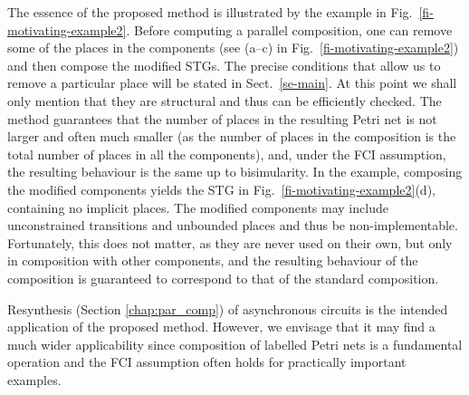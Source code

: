 The essence of the proposed method is illustrated by the example in Fig.~\ref{fi-motivating-example2}. Before computing a parallel composition, one can remove some of the places in the components (see (a--c) in Fig.~\ref{fi-motivating-example2}) and then compose the modified STGs. The precise conditions that allow us to remove a particular place will be stated in Sect.~\ref{se-main}. At this point we shall only mention that they are structural and thus can be efficiently checked. The method  guarantees that the number of places in the resulting Petri net is not larger and often much smaller (as the number of places in the composition is the total number of places in all the components), and, under the FCI assumption, the resulting behaviour is the same up to bisimularity. In the example, composing the modified components yields the STG in Fig.~\ref{fi-motivating-example2}(d), containing no implicit places. The modified components  may include unconstrained transitions and unbounded places and thus be non-implementable. Fortunately, this does not matter, as they are never used on their own, but only in composition with other components, and the resulting behaviour of the composition is guaranteed to correspond to that of the standard composition.

Resynthesis (Section \ref{chap:par_comp}) of asynchronous circuits is the intended application of the proposed method. However, we envisage that it may find a much wider applicability since composition of labelled Petri nets is a fundamental operation and the FCI assumption often holds for practically important examples.
